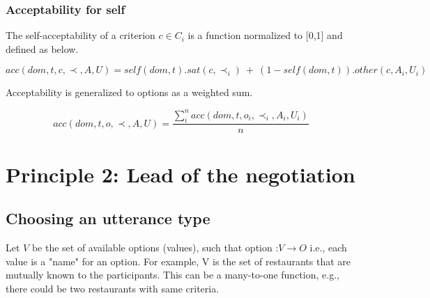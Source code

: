 \documentclass{article}
\begin{document}
	\subsubsection{Acceptability for self}

	The self-acceptability of a criterion $c \in C_i$ is a function	normalized to [0,1] and defined as below.
	
	$$acc(dom, t, c, \prec, A, U) = self(dom, t) . sat(c, \prec_i) \ +\  (1 - self(dom, t)) . other(c, A_i, U_i)$$
	
	Acceptability is generalized to options as a weighted sum.
	
	$$acc(dom, t, o, \prec, A, U) = \frac{ \sum_{i}^{n} acc(dom, t, o_i, \prec_i, A_i, U_i) } {n}$$ 
	
	
	\section{Principle 2: Lead of the negotiation}
%	
	
%	
%	
%		
	
	\subsection{Choosing an utterance type}
		
		Let $V$ be the set of available options (values), such that option :$ V\rightarrow O$	i.e., each value is a "name" for an option.  For example, V is the set of restaurants that are mutually known to the participants. This can be a many-to-one function, e.g., there could be two restaurants with same criteria.
\end{document}
